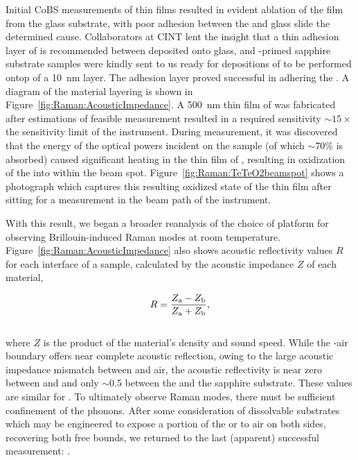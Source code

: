 \begin{table}[ht]
    \label{tab:Raman:Te}
\end{table}

Initial \ac{CoBS} measurements of  thin films resulted in evident ablation of the film from the glass substrate, with poor adhesion between the  and glass slide the determined cause. Collaborators at \ac{CINT} lent the insight that a thin adhesion layer of  is recommended between  deposited onto glass, and -primed sapphire substrate samples were kindly sent to us ready for depositions of  to be performed ontop of a \SI{10}{\nano\meter}  layer. The  adhesion layer proved successful in adhering the . A diagram of the material layering is shown in Figure~\ref{fig:Raman:AcousticImpedance}. A \SI{500}{\nano\meter} thin film of  was fabricated after estimations of feasible measurement resulted in a required sensitivity \(\sim\)\(15\times\) the sensitivity limit of the instrument. During measurement, it was discovered that the energy of the optical powers incident on the sample (of which \(\sim\)70\% is absorbed) caused significant heating in the thin film of , resulting in oxidization of the  into  within the beam spot. Figure~\ref{fig:Raman:TeTeO2beamspot} shows a photograph which captures this resulting oxidized state of the  thin film after sitting for a measurement in the beam path of the instrument.

With this result, we began a broader reanalysis of the choice of platform for observing Brillouin-induced Raman modes at room temperature. Figure~\ref{fig:Raman:AcousticImpedance} also shows acoustic reflectivity values \(R\) for each interface of a  sample, calculated by the acoustic impedance \(Z\) of each material,

\begin{equation}
  R = \frac{Z_{\rm a} - Z_{\rm b}}{Z_{\rm a} + Z_{\rm b}},
\end{equation}
\\
where \(Z\) is the product of the material's density and sound speed. While the -air boundary offers near complete acoustic reflection, owing to the large acoustic impedance mismatch between  and air, the acoustic reflectivity is near zero between  and  and only \(\sim\)0.5 between the  and the sapphire substrate. These values are similar for . To ultimately observe Raman modes, there must be sufficient confinement of the phonons. After some consideration of dissolvable substrates which may be engineered to expose a portion of the  or  to air on both sides, recovering both free bounds, we returned to the last (apparent) successful measurement: .

